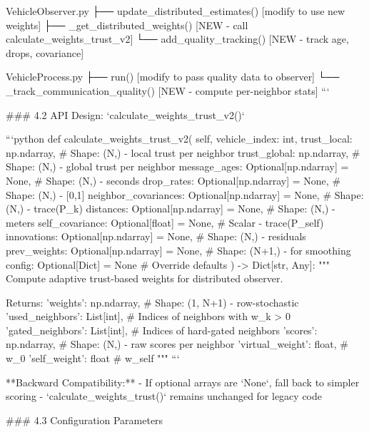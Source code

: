 VehicleObserver.py
├── update_distributed_estimates()     [modify to use new weights]
├── _get_distributed_weights()         [NEW - call calculate_weights_trust_v2]
└── add_quality_tracking()             [NEW - track age, drops, covariance]

VehicleProcess.py
├── run()                              [modify to pass quality data to observer]
└── _track_communication_quality()     [NEW - compute per-neighbor stats]
```

### 4.2 API Design: `calculate_weights_trust_v2()`

```python
def calculate_weights_trust_v2(
    self,
    vehicle_index: int,
    trust_local: np.ndarray,      # Shape: (N,) - local trust per neighbor
    trust_global: np.ndarray,     # Shape: (N,) - global trust per neighbor
    message_ages: Optional[np.ndarray] = None,        # Shape: (N,) - seconds
    drop_rates: Optional[np.ndarray] = None,          # Shape: (N,) - [0,1]
    neighbor_covariances: Optional[np.ndarray] = None, # Shape: (N,) - trace(P_k)
    distances: Optional[np.ndarray] = None,           # Shape: (N,) - meters
    self_covariance: Optional[float] = None,          # Scalar - trace(P_self)
    innovations: Optional[np.ndarray] = None,         # Shape: (N,) - residuals
    prev_weights: Optional[np.ndarray] = None,        # Shape: (N+1,) - for smoothing
    config: Optional[Dict] = None                      # Override defaults
) -> Dict[str, Any]:
    """
    Compute adaptive trust-based weights for distributed observer.
    
    Returns:
        {
            'weights': np.ndarray,        # Shape: (1, N+1) - row-stochastic
            'used_neighbors': List[int],  # Indices of neighbors with w_k > 0
            'gated_neighbors': List[int], # Indices of hard-gated neighbors
            'scores': np.ndarray,         # Shape: (N,) - raw scores per neighbor
            'virtual_weight': float,      # w_0
            'self_weight': float          # w_self
        }
    """
```

**Backward Compatibility:**
- If optional arrays are `None`, fall back to simpler scoring
- `calculate_weights_trust()` remains unchanged for legacy code

### 4.3 Configuration Parameters

